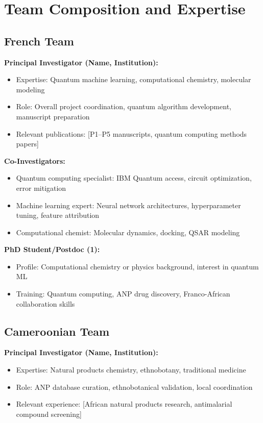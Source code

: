 \documentclass[11pt,a4paper]{article}
\begin{document}
\section{Team Composition and Expertise}

\subsection{French Team}

\textbf{Principal Investigator (Name, Institution):}
\begin{itemize}
    \item Expertise: Quantum machine learning, computational chemistry, molecular modeling
    \item Role: Overall project coordination, quantum algorithm development, manuscript preparation
    \item Relevant publications: [P1--P5 manuscripts, quantum computing methods papers]
\end{itemize}

\textbf{Co-Investigators:}
\begin{itemize}
    \item Quantum computing specialist: IBM Quantum access, circuit optimization, error mitigation
    \item Machine learning expert: Neural network architectures, hyperparameter tuning, feature attribution
    \item Computational chemist: Molecular dynamics, docking, QSAR modeling
\end{itemize}

\textbf{PhD Student/Postdoc (1):}
\begin{itemize}
    \item Profile: Computational chemistry or physics background, interest in quantum ML
    \item Training: Quantum computing, ANP drug discovery, Franco-African collaboration skills
\end{itemize}

\subsection{Cameroonian Team}

\textbf{Principal Investigator (Name, Institution):}
\begin{itemize}
    \item Expertise: Natural products chemistry, ethnobotany, traditional medicine
    \item Role: ANP database curation, ethnobotanical validation, local coordination
    \item Relevant experience: [African natural products research, antimalarial compound screening]
\end{itemize}
\end{document}
